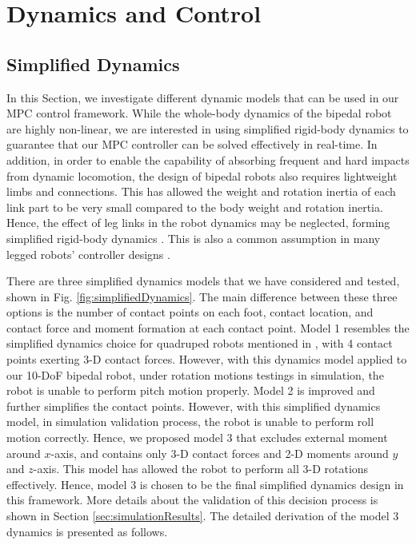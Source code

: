 \section{Dynamics and Control}
\label{sec:dynamicsAndControl}
\subsection{Simplified Dynamics}
\label{subsec:simplified_dynamics}
In this Section, we investigate different dynamic models that can be used in our MPC control framework. 
While the whole-body dynamics of the bipedal robot are highly non-linear, we are interested in using simplified rigid-body dynamics to guarantee that our MPC controller can be solved effectively in real-time. 
In addition, in order to enable the capability of absorbing frequent and hard impacts from dynamic locomotion, the design of bipedal robots also requires lightweight limbs and connections. This has allowed the weight and rotation inertia of each link part to be very small compared to the body weight and rotation inertia. Hence, the effect of leg links in the robot dynamics may be neglected, forming simplified rigid-body dynamics \cite{nguyen2019optimized,bledt2018cheetah}. This is also a common assumption in many legged robots’ controller designs \cite{focchi2017high,stephens2010push}.

There are three simplified dynamics models that we have considered and tested, shown in Fig. \ref{fig:simplifiedDynamics}. The main difference between these three options is the number of contact points on each foot, contact location, and contact force and moment formation at each contact point. Model 1 resembles the simplified dynamics choice for quadruped robots mentioned in \cite{bledt2018cheetah}, with 4 contact points exerting 3-D contact forces. However, with this dynamics model applied to our 10-DoF bipedal robot, under rotation motions testings in simulation, the robot is unable to perform pitch motion properly. Model 2 is improved and further simplifies the contact points. However, with this simplified dynamics model, in simulation validation process, the robot is unable to perform roll motion correctly. Hence, we proposed model 3 that excludes external moment around $x$-axis, and contains only 3-D contact forces and 2-D moments around $y$ and $z$-axis. This model has allowed the robot to perform all 3-D rotations effectively. Hence, model 3 is chosen to be the final simplified dynamics design in this framework. More details about the validation of this decision process is shown in Section \ref{sec:simulationResults}.
The detailed derivation of the model 3 dynamics is presented as follows.

